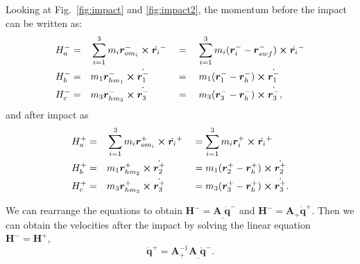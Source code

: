 Looking at Fig.~\ref{fig:impact} and \ref{fig:impact2}, the momentum before the impact can be written as:
\begin{alignat}{2}
H_a^- = & \quad\sum_{i=1}^{3} m_i \bm{r}_{{om}_i}^{-} \cross \dot{\bm{r}_i}^{-} && = \quad \sum_{i=1}^{3} m_i (\bm{r}_i^{-} - \bm{r}_{swf}^{-}) \cross \dot{\bm{r}_i}^{-}\\
H_b^- = &\quad m_1 \bm{r}_{hm_1}^- \cross \dot{\bm{r}_1^-} && = \quad m_1 (\bm{r}_{1}^- - \bm{r}_{h}^-) \cross \dot{\bm{r}_1^-} \\
H_c^- = &\quad m_3 \bm{r}_{hm_3}^- \cross \dot{\bm{r}_3^-} && = \quad m_3 (\bm{r}_3^- - \bm{r}_h^-) \cross \dot{\bm{r}_3^-},
\end{alignat}
and after impact as
\begin{alignat}{2}
H_a^+ = &\quad \sum_{i=1}^{3} m_i \bm{r}_{{om}_i}^{+} \cross \dot{\bm{r}_i}^{+} && = \sum_{i=1}^{3} m_i \bm{r}_i^{+} \cross \dot{\bm{r}_i}^{+}\\ 
H_b^+ = & \quad m_1 \bm{r}_{{hm}_2}^+ \cross \dot{\bm{r}_2^+} && = m_1 (\bm{r}_{2}^+ - \bm{r}_{h}^+ ) \cross \dot{\bm{r}_2^+} \\
H_c^+ = & \quad m_3 \bm{r}_{{hm}_3}^+ \cross \dot{\bm{r}_3^+} && = m_3 (\bm{r}_{3}^+ - \bm{r}_{h}^+) \cross \dot{\bm{r}_3^+}.
\end{alignat}

We can rearrange the equations to obtain $\bm{H}^- = \bm{A}_{\_} \dot{\bm{q}}^-$ and $\bm{H}^- = \bm{A}_{+} \dot{\bm{q}}^+$. Then we can obtain the velocities after the impact by solving the linear equation $\bm{H}^- = \bm{H}^+$, 
\begin{equation}
\dot{\bm{q}}^+ = \bm{A}_{+}^{-1} \bm{A}_{\_}  \dot{\bm{q}}^-. 
\end{equation}

